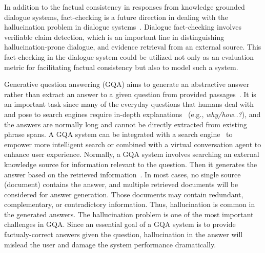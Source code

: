 In addition to the factual consistency in responses from knowledge grounded dialogue systems, fact-checking is a future direction in dealing with the hallucination problem in dialogue systems~. Dialogue fact-checking involves verifiable claim detection, which is an important line in distinguishing hallucination-prone dialogue, and evidence retrieval from an external source. This fact-checking in the dialogue system could be utilized not only as an evaluation metric for facilitating factual consistency but also to model such a system.

\label{section:QA}
Generative question answering (GQA) aims to generate an abstractive answer rather than extract an answer to a given question from provided passages~. It is an important task since many of the everyday questions that humans deal with and pose to search engines require in-depth explanations~ (e.g., \textit{why/how..?}), and the answers are normally long and cannot be directly extracted from existing phrase spans. A GQA system can be integrated with a search engine~ to empower more intelligent search or combined with a virtual conversation agent to enhance user experience. 
Normally, a GQA system involves searching an external knowledge source for information relevant to the question. Then it generates the answer based on the retrieved information~. In most cases, no single source (document) contains the answer, and multiple retrieved documents will be considered for answer generation. Those documents may contain redundant, complementary, or contradictory information. Thus, hallucination is common in the generated answers. 
The hallucination problem is one of the most important challenges in GQA. Since an essential goal of a GQA system is to provide factualy-correct answers given the question, hallucination in the answer will mislead the user and damage the system performance dramatically.

